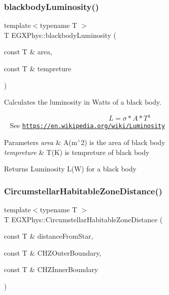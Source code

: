 \subsubsection{\texorpdfstring{blackbody\+Luminosity()}{blackbodyLuminosity()}}
{\footnotesize\ttfamily template$<$typename T $>$ \\
T E\+G\+X\+Phys\+::blackbody\+Luminosity (\begin{DoxyParamCaption}\item[{const T \&}]{area,  }\item[{const T \&}]{tempreture }\end{DoxyParamCaption})}



Calculates the luminosity in Watts of a black body. 

\[L=\sigma*A*T^4\] ~\newline
See \href{https://en.wikipedia.org/wiki/Luminosity}{\tt https\+://en.\+wikipedia.\+org/wiki/\+Luminosity}


\begin{DoxyParams}{Parameters}
{\em area} & A(m$^\wedge$2) is the area of black body \\
\hline
{\em tempreture} & T(\+K) is tempreture of black body \\
\hline
\end{DoxyParams}
\begin{DoxyReturn}{Returns}
Luminosity L(\+W) for a black body 
\end{DoxyReturn}
\mbox{\label{group___astrophysics_gacf3a720793cdb27f6d93b170b44e81be}} 
\subsubsection{\texorpdfstring{Circumstellar\+Habitable\+Zone\+Distance()}{CircumstellarHabitableZoneDistance()}}
{\footnotesize\ttfamily template$<$typename T $>$ \\
T E\+G\+X\+Phys\+::\+Circumstellar\+Habitable\+Zone\+Distance (\begin{DoxyParamCaption}\item[{const T \&}]{distance\+From\+Star,  }\item[{const T \&}]{C\+H\+Z\+Outer\+Boundary,  }\item[{const T \&}]{C\+H\+Z\+Inner\+Boundary }\end{DoxyParamCaption})}



